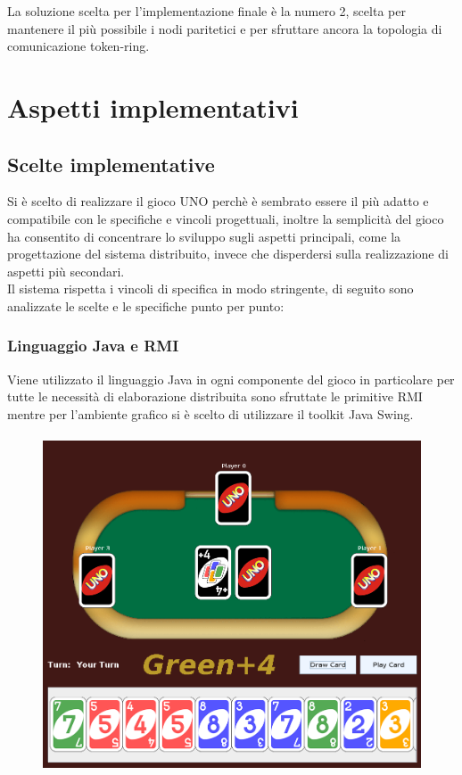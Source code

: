\documentclass[10pt,a4paper]{article}
\begin{document}
La soluzione scelta per l'implementazione finale è la numero 2, scelta per mantenere il più possibile i nodi paritetici e per sfruttare ancora la topologia di comunicazione token-ring. 

\section{Aspetti implementativi}
\subsection{Scelte implementative}
Si è scelto di realizzare il gioco UNO perchè è sembrato essere il più adatto e compatibile con le specifiche e vincoli progettuali, inoltre la semplicità del gioco ha consentito di concentrare lo sviluppo sugli aspetti principali, come la progettazione del sistema distribuito, invece che disperdersi sulla realizzazione di aspetti più secondari.\\
Il sistema rispetta i vincoli di specifica in modo stringente, di seguito sono analizzate le scelte e le specifiche punto per punto:

\subsubsection{Linguaggio Java e RMI}
Viene utilizzato il linguaggio Java in ogni componente del gioco in particolare per tutte le necessità di elaborazione distribuita sono sfruttate le primitive RMI mentre per l'ambiente grafico si è scelto di utilizzare il toolkit Java Swing.

\begin{figure}[H]
\begin{center}
\includegraphics[height=10cm, keepaspectratio]{Selection_011.png}
\end{center}
\end{figure}
\end{document}
